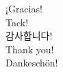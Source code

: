 \documentclass[
  9pt
  , table
  , ignorenonframetext
]{beamer}
\begin{document}
\begin{frame}[plain]
  \begin{center}
    {\LARGE ¡Gracias!}\\\vspace{6mm}
    {\LARGE Tack!}  \\\vspace{6mm}
    {\LARGE 감사합니다!}\\\vspace{6mm}
    {\LARGE Thank you!}  \\\vspace{6mm}
    {\LARGE Dankesch\"on!} \\\vspace{6mm}
    {\LARGE \smiley } 
  \end{center}
  
\end{frame}
\end{document}
